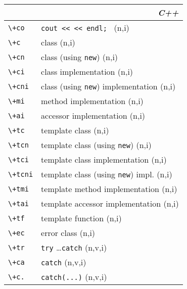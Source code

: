 \documentclass[oneside,10pt,landscape,DIV16]{scrartcl}
\begin{document}
\begin{multicols}{3}
\begin{center}
%
\begin{tabular}[]{|p{11mm}|p{58mm}|}
\hline 
\multicolumn{2}{|r|}{\textsl{C\textbf{+}+}} \\
\hline \verb'\+co'  & \verb'cout << << endl; '                \hfill (n,i)\\
\hline \verb'\+c'   & class                                   \hfill (n,i)\\
\hline \verb'\+cn'  & class (using \verb'new')                \hfill (n,i)\\
\hline \verb'\+ci'  & class  implementation                   \hfill (n,i)\\
\hline \verb'\+cni' & class (using \verb'new') implementation \hfill (n,i)\\
\hline \verb'\+mi'  & method implementation                   \hfill (n,i)\\
\hline \verb'\+ai'  & accessor implementation                 \hfill (n,i)\\
\hline \verb'\+tc'  & template class                          \hfill (n,i)\\
\hline \verb'\+tcn' & template class (using \verb'new')       \hfill (n,i)\\
\hline \verb'\+tci' & template class  implementation          \hfill (n,i)\\
\hline \verb'\+tcni'& template class (using \verb'new') impl. \hfill (n,i)\\
\hline \verb'\+tmi' & template method implementation          \hfill (n,i)\\
\hline \verb'\+tai' & template accessor implementation        \hfill (n,i)\\
\hline \verb'\+tf'  & template function                       \hfill (n,i)\\
\hline \verb'\+ec'  & error class                             \hfill (n,i)\\
\hline \verb'\+tr'  & \verb'try' \dots \verb'catch'           \hfill (n,v,i)\\
\hline \verb'\+ca'  & \verb'catch'                            \hfill (n,v,i)\\
\hline \verb'\+c.'  & \verb'catch(...)'                       \hfill (n,v,i)\\

\end{tabular}
\end{center}
\end{multicols}
\end{document}
